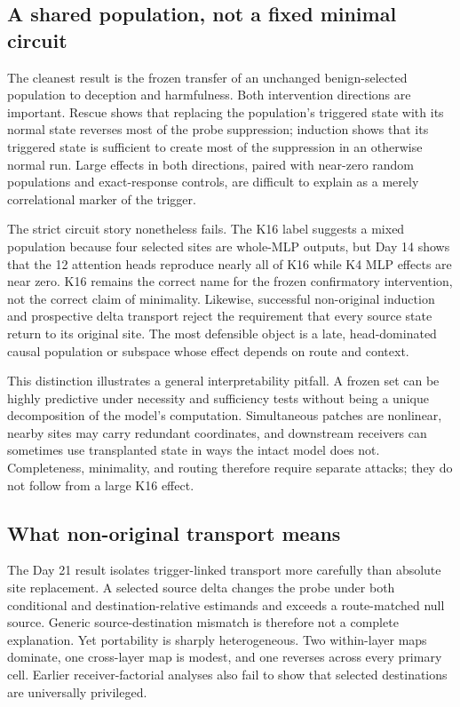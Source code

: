 \documentclass[10pt]{article}
\begin{document}
\subsection{A shared population, not a fixed minimal circuit}

The cleanest result is the frozen transfer of an unchanged benign-selected population to deception and harmfulness. Both intervention directions are important. Rescue shows that replacing the population's triggered state with its normal state reverses most of the probe suppression; induction shows that its triggered state is sufficient to create most of the suppression in an otherwise normal run. Large effects in both directions, paired with near-zero random populations and exact-response controls, are difficult to explain as a merely correlational marker of the trigger.

The strict circuit story nonetheless fails. The K16 label suggests a mixed population because four selected sites are whole-MLP outputs, but Day 14 shows that the 12 attention heads reproduce nearly all of K16 while K4 MLP effects are near zero. K16 remains the correct name for the frozen confirmatory intervention, not the correct claim of minimality. Likewise, successful non-original induction and prospective delta transport reject the requirement that every source state return to its original site. The most defensible object is a late, head-dominated causal population or subspace whose effect depends on route and context.

This distinction illustrates a general interpretability pitfall. A frozen set can be highly predictive under necessity and sufficiency tests without being a unique decomposition of the model's computation. Simultaneous patches are nonlinear, nearby sites may carry redundant coordinates, and downstream receivers can sometimes use transplanted state in ways the intact model does not. Completeness, minimality, and routing therefore require separate attacks; they do not follow from a large K16 effect.

\subsection{What non-original transport means}

The Day 21 result isolates trigger-linked transport more carefully than absolute site replacement. A selected source delta changes the probe under both conditional and destination-relative estimands and exceeds a route-matched null source. Generic source-destination mismatch is therefore not a complete explanation. Yet portability is sharply heterogeneous. Two within-layer maps dominate, one cross-layer map is modest, and one reverses across every primary cell. Earlier receiver-factorial analyses also fail to show that selected destinations are universally privileged.
\end{document}
